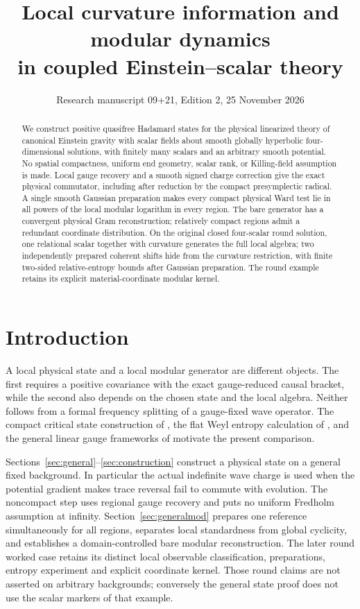 \documentclass[11pt]{article}
\title{Local curvature information and modular dynamics\\in coupled Einstein--scalar theory}
\author{}
\date{Research manuscript 09+21, Edition 2, 25 November 2026}
\begin{document}
\maketitle

\begin{abstract}
We construct positive quasifree Hadamard states for the physical
linearized theory of canonical Einstein gravity with scalar fields about smooth
globally hyperbolic four-dimensional solutions, with finitely many
scalars and an arbitrary smooth potential. No spatial compactness,
uniform end geometry, scalar rank, or Killing-field assumption is made.
Local gauge recovery and a smooth signed charge correction give the
exact physical commutator, including after reduction by the compact
presymplectic radical. A single smooth Gaussian preparation makes
every compact physical Ward test lie in all powers of the local modular
logarithm in every region. The bare generator has a convergent
physical Gram reconstruction; relatively compact regions admit a
redundant coordinate distribution. On the original closed four-scalar
round solution, one relational scalar together with curvature generates
the full local algebra; two independently prepared coherent shifts
hide from the curvature restriction, with finite two-sided
relative-entropy bounds after Gaussian preparation. The round example
retains its explicit material-coordinate modular kernel.
\end{abstract}

\section{Introduction}
A local physical state and a local modular generator are different
objects. The first requires a positive covariance with the exact
gauge-reduced causal bracket, while the second also depends on the
chosen state and the local algebra. Neither follows from a formal
frequency splitting of a gauge-fixed wave operator. The compact
critical state construction of \cite{p09}, the flat Weyl entropy
calculation of \cite{p21}, and the general linear gauge frameworks of
\cite{hack,hackschenkel,khavpeierls} motivate the present comparison.

Sections~\ref{sec:general}--\ref{sec:construction} construct a physical
state on a general fixed background. In particular the actual
indefinite wave charge is used when the potential gradient makes
trace reversal fail to commute with evolution. The noncompact step
uses regional gauge recovery and puts no uniform Fredholm assumption
at infinity. Section~\ref{sec:generalmod} prepares one reference
simultaneously for all regions, separates local standardness from
global cyclicity, and establishes a domain-controlled bare modular
reconstruction. The later round worked case retains its distinct
local observable classification, preparations, entropy experiment
and explicit coordinate kernel. Those round claims are not asserted
on arbitrary backgrounds; conversely the general state proof does
not use the scalar markers of that example.
\end{document}
